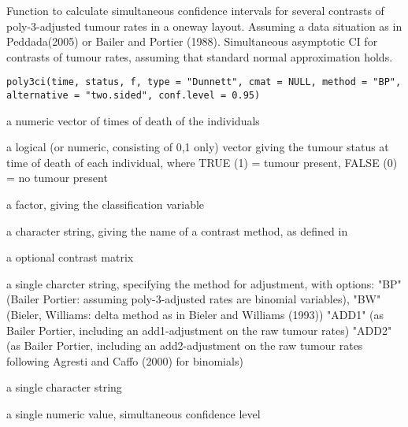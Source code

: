 \begin{Description}\relax
Function to calculate simultaneous confidence intervals for several contrasts
of poly-3-adjusted tumour rates in a oneway layout.
Assuming a data situation as in Peddada(2005) or Bailer and Portier (1988).
Simultaneous asymptotic CI for contrasts of tumour rates, assuming that
standard normal approximation holds.
\end{Description}
\begin{Usage}
\begin{verbatim}
poly3ci(time, status, f, type = "Dunnett", cmat = NULL, method = "BP", alternative = "two.sided", conf.level = 0.95)
\end{verbatim}
\end{Usage}
\begin{Arguments}
\begin{ldescription}
\item[\code{time}] a numeric vector of times of death of the individuals
\item[\code{status}] a logical (or numeric, consisting of 0,1 only) vector giving the tumour status at time of death of each individual,
where TRUE (1) = tumour present, FALSE (0) = no tumour present  
\item[\code{f}] a factor, giving the classification variable 
\item[\code{type}] a character string, giving the name of a contrast method, as defined in  
\item[\code{cmat}] a optional contrast matrix 
\item[\code{method}] a single charcter string, specifying the method for adjustment,
with options: "BP" (Bailer Portier: assuming poly-3-adjusted rates are binomial variables),
"BW" (Bieler, Williams: delta method as in Bieler and Williams (1993))
"ADD1" (as Bailer Portier, including an add1-adjustment on the raw tumour rates)
"ADD2" (as Bailer Portier, including an add2-adjustment on the raw tumour rates following Agresti and Caffo (2000) for binomials)

\item[\code{alternative}] a single character string 
\item[\code{conf.level}] a single numeric value, simultaneous confidence level 
\end{ldescription}
\end{Arguments}
\begin{Details}\relax
\end{Details}
